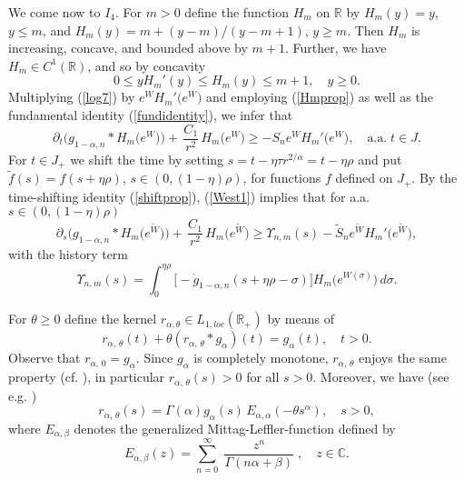 \documentclass[10pt]{article}
\newcommand{\iR}{\mathbb{R}}
\newcommand{\iC}{\mathbb{C}}
\begin{document}
We come now to $I_4$. For $m>0$ define the function $H_m$ on $\iR$
by $H_m(y)=y$, $y\le m$, and $H_m(y)=m+(y-m)/(y-m+1)$, $y\ge m$.
Then $H_m$ is increasing, concave, and bounded above by $m+1$.
Further, we have $H_m\in C^1(\iR)$, and so by concavity
\begin{equation} \label{Hmprop}
0\le yH_m'(y)\le H_m(y)\le m+1,\quad y\ge 0.
\end{equation}
Multiplying (\ref{log7}) by $e^W H_m'\big(e^W\big)$ and employing
(\ref{Hmprop}) as well as the fundamental identity
(\ref{fundidentity}), we infer that
\begin{equation} \label{West1}
\partial_t\Big(g_{1-\alpha,n}\ast
H_m\big(e^W\big)\Big)+\,\frac{C_1}{r^2}\,H_m\big(e^W\big)\ge - S_n
e^W H_m'\big(e^W\big),\quad \mbox{a.a.}\;t\in J.
\end{equation}
For $t\in J_+$ we shift the time by setting $s=t-\eta\tau
r^{2/\alpha}=t-\eta \rho$ and put $\tilde{f}(s)=f(s+\eta \rho)$,
$s\in (0,(1-\eta)\rho)$, for functions $f$ defined on $J_+$. By
the time-shifting identity (\ref{shiftprop}), (\ref{West1})
implies that for a.a. $s\in (0,(1-\eta)\rho)$
\begin{equation} \label{West2}
\partial_s\Big(g_{1-\alpha,n}\ast
H_m\big(e^{\tilde{W}}\big)\Big)+\,\frac{C_1}{r^2}\,H_m\big(e^{\tilde{W}}\big)\ge
\Upsilon_{n,m}(s)- \tilde{S}_n e^{\tilde{W}}
H_m'\big(e^{\tilde{W}}\big),
\end{equation}
with the history term
\[
\Upsilon_{n,m}(s)=\int_0^{\eta\rho}\big[-\dot{g}_{1-\alpha,n}(s+\eta\rho-\sigma)\big]
H_m\big(e^{W(\sigma)}\big)\,d\sigma.
\]

For $\theta\ge 0$ define the kernel $r_{\alpha,\theta}\in
L_{1,loc}(\iR_+)$ by means of
\[ r_{\alpha,\,\theta}(t)+\theta (r_{\alpha,\,\theta}\ast g_\alpha)(t)=
g_\alpha(t),\quad t>0.\] Observe that $r_{\alpha,\,0}=g_\alpha$.
Since $g_\alpha$ is completely monotone, $r_{\alpha,\,\theta}$
enjoys the same property (cf. \cite[Chap. 5]{GLS}), in particular
$r_{\alpha,\,\theta}(s)>0$ for all $s>0$. Moreover, we have (see
e.g. \cite{Za})
\[
r_{\alpha,\,\theta}(s) =\Gamma(\alpha)
g_\alpha(s)\,E_{\alpha,\alpha}(-\theta s^\alpha),\quad s>0,
\]
where $E_{\alpha,\beta}$ denotes the generalized
Mittag-Leffler-function defined by
\[ E_{\alpha,\beta}(z)=\sum_{n=0}^\infty \;\frac{z^n}
{\Gamma(n\alpha+\beta)}\;,\quad z\in \iC.
\]
\end{document}
